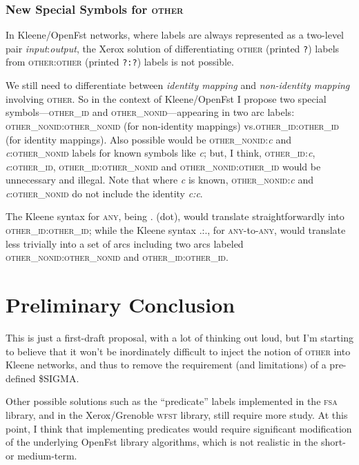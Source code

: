 \documentclass[letterpaper,11pt]{article}
\providecommand{\acro}{}\renewcommand{\acro}{\textsc}
\begin{document}
\subsubsection{New Special Symbols for \acro{other}}

In Kleene/OpenFst networks, where labels are always represented as a
two-level pair \emph{input}:\emph{output}, the Xerox solution of
differentiating \acro{other} (printed \texttt{?}) labels from
\acro{other}:\acro{other} (printed \texttt{?:?}) labels is not
possible.

We still need to differentiate
between \emph{identity mapping} and \emph{non-identity mapping}
involving \acro{other}.
So in the context of Kleene/OpenFst I  
propose two special symbols---\acro{other\_id} and
\acro{other\_nonid}---appearing
in  two arc labels:
\acro{other\_nonid}:\acro{other\_nonid} (for non-identity mappings)
vs.\@ \acro{other\_id}:\acro{other\_id} (for identity mappings).  Also possible would be
\acro{other\_nonid}:\emph{c} and \emph{c}:\acro{other\_nonid} labels for known symbols like
\emph{c}; but, I think, 
\acro{other\_id}:\emph{c}, \emph{c}:\acro{other\_id}, \acro{other\_id}:\acro{other\_nonid} and \acro{other\_nonid}:\acro{other\_id} would  
be unnecessary and illegal.
Note that where \emph{c} is known,
\acro{other\_nonid}:\emph{c} and \emph{c}:\acro{other\_nonid} do not include the identity
\emph{c:c}.

The Kleene syntax for \acro{any}, being . (dot), would translate
straightforwardly into \acro{other\_id}:\acro{other\_id}; while the Kleene syntax
.:., for \acro{any}-to-\acro{any}, would translate less trivially into
a set of arcs including two arcs labeled \acro{other\_nonid}:\acro{other\_nonid} and
\acro{other\_id}:\acro{other\_id}.


\section{Preliminary Conclusion}

This is just a first-draft proposal, with a lot of thinking out loud,
but I'm starting to believe that it won't be inordinately difficult
to inject the notion of \acro{other} into Kleene networks, and thus
to remove the requirement (and limitations) of a pre-defined \$SIGMA.

Other possible solutions such as the ``predicate'' labels implemented in the \acro{fsa} library, and
in the Xerox/Grenoble \acro{wfst} library, still require more study.  At this point, I
think that implementing predicates would require significant modification of the
underlying OpenFst library algorithms, which is not realistic in the short- or medium-term.
\end{document}
